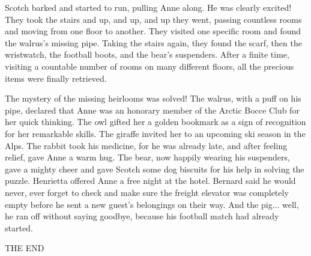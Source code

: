 Scotch barked and started to run, pulling Anne along. He was clearly excited! They took the stairs and up, and up, and up they went, passing countless rooms and moving from one floor to another. They visited one specific room and found the walrus's missing pipe. Taking the stairs again, they found the scarf, then the wristwatch, the football boots, and the bear's suspenders. After a finite time, visiting a countable number of rooms on many different floors, all the precious items were finally retrieved.

\clearpage


The mystery of the missing heirlooms was solved! The walrus, with a puff on his pipe, declared that Anne was an honorary member of the Arctic Bocce Club for her quick thinking. The owl gifted her a golden bookmark as a sign of recognition for her remarkable skills. The giraffe invited her to an upcoming ski season in the Alps. The rabbit took his medicine, for he was already late, and after feeling relief, gave Anne a warm hug. The bear, now happily wearing his suspenders, gave a mighty cheer and gave Scotch some dog biscuits for his help in solving the puzzle. Henrietta offered Anne a free night at the hotel. Bernard said he would never, ever forget to check and make sure the freight elevator was completely empty before he sent a new guest's belongings on their way. And the pig... well, he ran off without saying goodbye, because his football match had already started.

\vfill
\begin{center}
\Huge
THE END
\end{center}

